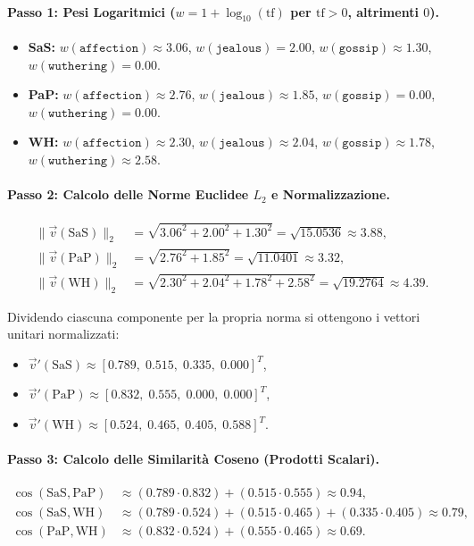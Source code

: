 \paragraph{Passo 1: Pesi Logaritmici ($w = 1 + \log_{10}(\text{tf})$ per $\text{tf} > 0$, altrimenti $0$).}
\begin{itemize}
    \item \textbf{SaS:}
    $w(\texttt{affection}) \approx 3.06$, \quad
    $w(\texttt{jealous}) = 2.00$, \quad
    $w(\texttt{gossip}) \approx 1.30$, \quad
    $w(\texttt{wuthering}) = 0.00$.
    \item \textbf{PaP:}
    $w(\texttt{affection}) \approx 2.76$, \quad
    $w(\texttt{jealous}) \approx 1.85$, \quad
    $w(\texttt{gossip}) = 0.00$, \quad
    $w(\texttt{wuthering}) = 0.00$.
    \item \textbf{WH:}
    $w(\texttt{affection}) \approx 2.30$, \quad
    $w(\texttt{jealous}) \approx 2.04$, \quad
    $w(\texttt{gossip}) \approx 1.78$, \quad
    $w(\texttt{wuthering}) \approx 2.58$.
\end{itemize}

\paragraph{Passo 2: Calcolo delle Norme Euclidee $L_2$ e Normalizzazione.}
\begin{align*}
\|\vec{v}(\text{SaS})\|_2 &= \sqrt{3.06^2 + 2.00^2 + 1.30^2} = \sqrt{15.0536} \approx 3.88, \\
\|\vec{v}(\text{PaP})\|_2 &= \sqrt{2.76^2 + 1.85^2} = \sqrt{11.0401} \approx 3.32, \\
\|\vec{v}(\text{WH})\|_2  &= \sqrt{2.30^2 + 2.04^2 + 1.78^2 + 2.58^2} = \sqrt{19.2764} \approx 4.39.
\end{align*}

Dividendo ciascuna componente per la propria norma si ottengono i vettori unitari normalizzati:
\begin{itemize}
    \item $\vec{v}'(\text{SaS}) \approx [0.789, \; 0.515, \; 0.335, \; 0.000]^T$,
    \item $\vec{v}'(\text{PaP}) \approx [0.832, \; 0.555, \; 0.000, \; 0.000]^T$,
    \item $\vec{v}'(\text{WH}) \approx [0.524, \; 0.465, \; 0.405, \; 0.588]^T$.
\end{itemize}

\paragraph{Passo 3: Calcolo delle Similarit\`a Coseno (Prodotti Scalari).}
\begin{align*}
\cos(\text{SaS}, \text{PaP}) &\approx (0.789 \cdot 0.832) + (0.515 \cdot 0.555) \approx \mathbf{0.94}, \\
\cos(\text{SaS}, \text{WH})  &\approx (0.789 \cdot 0.524) + (0.515 \cdot 0.465) + (0.335 \cdot 0.405) \approx \mathbf{0.79}, \\
\cos(\text{PaP}, \text{WH})  &\approx (0.832 \cdot 0.524) + (0.555 \cdot 0.465) \approx \mathbf{0.69}.
\end{align*}

